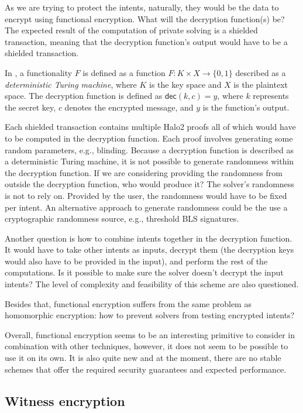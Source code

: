 \documentclass[
    9pt,            %
    report,        %
    affiltop,       %
]{art}
\begin{document}
As we are trying to protect the intents, naturally, they would be the data to encrypt using functional encryption. What will the decryption function(s) be? The expected result of the computation of private solving is a shielded transaction, meaning that the decryption function's output would have to be a shielded transaction.

In \citep{fe}, a functionality $F$ is defined as a function $F: K \times X
\rightarrow \{0, 1\}$ described as a \textit{deterministic Turing machine}, where $K$ is the key space and $X$ is the plaintext space. The
decryption function is defined as $\mathsf{dec}(k, c) = y$, where $k$
represents the secret key, $c$ denotes the encrypted message, and $y$ is the
function's output.

Each shielded transaction contains multiple Halo2 proofs all of which would have to be computed in the decryption function. Each proof involves generating some random parameters, e.g., blinding. Because a decryption function is described as a deterministic Turing machine, it is not possible to generate randomness within the decryption function. If we are considering providing the randomness from outside the decryption function, who would produce it? The solver's randomness is not to rely on. Provided by the user, the randomness would have to be fixed per intent. An alternative approach to generate randomness could be the use a cryptographic randomness source, e.g., threshold BLS signatures.

Another question is how to combine intents together in the decryption function. It would have to take other intents as inputs, decrypt them (the decryption keys would also have to be provided in the input), and perform the rest of the computations. Is it possible to make sure the solver doesn't decrypt the input intents? The level of complexity and feasibility of this scheme are also questioned.

Besides that, functional encryption suffers from the same problem as homomorphic encryption: how to prevent solvers from testing encrypted intents?

Overall, functional encryption seems to be an interesting primitive to consider in combination with other techniques, however, it does not seem to be possible to use it on its own. It is also quite new and at the moment, there are no stable schemes that offer the required security guarantees and expected performance.


\subsection{Witness encryption}\label{WE-expanded}
\end{document}
